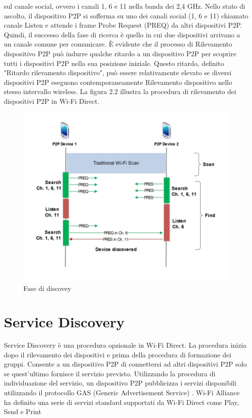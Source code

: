 sul canale social, ovvero i canali 1, 6 e 11 nella banda dei 2,4 GHz.
Nello stato di ascolto, il dispositivo P2P si sofferma su uno dei canali
social (1, 6 e 11) chiamato canale Listen e attende i frame Probe Request
(PREQ) da altri dispositivi P2P. Quindi, il successo della fase di ricerca 
è quello in cui due dispositivi arrivano a un canale comune per comunicare.
È evidente che il processo di Rilevamento dispositivo P2P può indurre 
qualche ritardo a un dispositivo P2P per scoprire tutti i 
dispositivi P2P nella sua posizione iniziale. Questo ritardo, definito 
"Ritardo rilevamento dispositivo", può essere relativamente elevato se 
diversi dispositivi P2P eseguono contemporaneamente Rilevamento dispositivo
nello stesso intervallo wireless. La figura 2.2 illustra la procedura di 
rilevamento dei dispositivi P2P in Wi-Fi Direct.

\begin{figure}
\caption{Fase di discovey}
\includegraphics[width=1\columnwidth]{imgs/DeviceDiscovery.jpg} %
\end{figure}


\section{Service Discovery}
Service Discovery è una
procedura opzionale in Wi-Fi Direct. La procedura inizia dopo il 
rilevamento dei dispositivi e prima della procedura di formazione dei 
gruppi. Consente a un dispositivo P2P di connettersi ad altri dispositivi
P2P solo se quest'ultimo fornisce il servizio previsto. Utilizzando la 
procedura di individuazione del servizio, un dispositivo P2P pubblicizza
i servizi disponibili utilizzando il protocollo GAS 
(Generic Advertisement Service) \cite{wikipedia_2015}. 
Wi-Fi Alliance ha definito una serie di servizi standard supportati
da Wi-Fi Direct come Play, Send e Print \cite{wi-fialliance}





